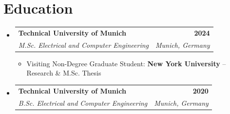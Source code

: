 \documentclass[letterpaper,11pt]{article}
\makeatletter
\newcommand{\resumeItem}[1]{
  \item\small{
    {#1 \vspace{-2pt}}
  }
}
\newcommand{\resumeSubheading}[4]{
  \vspace{-2pt}\item
    \begin{tabular*}{1.0\textwidth}[t]{l@{\extracolsep{\fill}}r}
      \textbf{#1} & \textbf{\small #2} \\
      \textit{\small#3} & \textit{\small #4} \\
    \end{tabular*}\vspace{-7pt}
}
\newcommand{\resumeSubHeadingListStart}{\begin{itemize}[leftmargin=0.0in, label={}]}
\newcommand{\resumeSubHeadingListEnd}{\end{itemize}}
\newcommand{\resumeItemListStart}{\begin{itemize}}
\newcommand{\resumeItemListEnd}{\end{itemize}\vspace{-5pt}}
\makeatother
\begin{document}
\section{Education}
  \resumeSubHeadingListStart
    \resumeSubheading
        {Technical University of Munich}{2024}
        {M.Sc. Electrical and Computer Engineering}{Munich, Germany}
        \resumeItemListStart
            \resumeItem{Visiting Non-Degree Graduate Student: \textbf{New York University} -- Research \& M.Sc. Thesis}
        \resumeItemListEnd
    \resumeSubheading
        {Technical University of Munich}{2020}
        {B.Sc. Electrical and Computer Engineering}{Munich, Germany}
  \resumeSubHeadingListEnd

%
\end{document}
